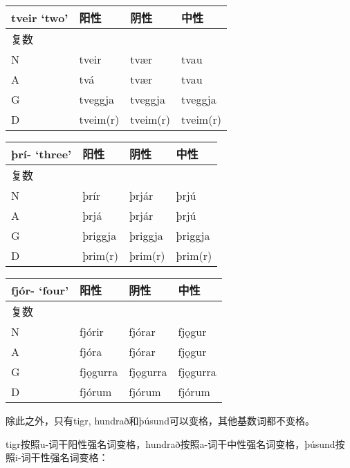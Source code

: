 {{\begin{longtable}{llll}
  \toprule
  tveir `two‌' & 阳性     & 阴性     & 中性     \\
  \midrule
  \endhead
  \bottomrule
  \endfoot
  复数        &          &          &          \\
  N           & tveir    & tvær     & tvau     \\
  A           & tvá      & tvær     & tvau     \\
  G           & tveggja  & tveggja  & tveggja  \\
  D           & tveim(r) & tveim(r) & tveim(r) \\
\end{longtable}

\begin{longtable}{llll}
  \toprule
  þrí- `three‌' & 阳性    & 阴性    & 中性    \\
  \midrule
  \endhead
  \bottomrule
  \endfoot
  复数         &         &         &         \\
  N            & þrír    & þrjár   & þrjú    \\
  A            & þrjá    & þrjár   & þrjú    \\
  G            & þriggja & þriggja & þriggja \\
  D            & þrim(r) & þrim(r) & þrim(r) \\
\end{longtable}

\begin{longtable}{llll}
  \toprule
  fjór- `four‌' & 阳性     & 阴性     & 中性     \\
  \midrule
  \endhead
  \bottomrule
  \endfoot
  复数         &          &          &          \\
  N            & fjórir   & fjórar   & fjǫgur   \\
  A            & fjóra    & fjórar   & fjǫgur   \\
  G            & fjǫgurra & fjǫgurra & fjǫgurra \\
  D            & fjórum   & fjórum   & fjórum   \\
\end{longtable}

除此之外，只有tigr, hundrað和þúsund可以变格，其他基数词都不变格。

tigr按照u-词干阳性强名词变格，hundrað按照a-词干中性强名词变格，þúsund按照i-词干性强名词变格：

}}
